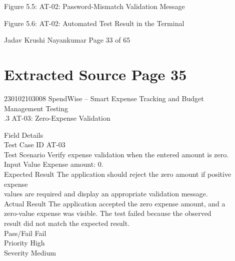 \documentclass[12pt,a4paper]{report}
\begin{document}
\smallskip

\smallskip

\smallskip

\smallskip
Figure 5.5: AT-02: Password-Mismatch Validation Message\\ 

\smallskip

\smallskip

\smallskip

\smallskip
Figure 5.6: AT-02: Automated Test Result in the Terminal\\ 

\smallskip

\smallskip
Jadav Krushi Nayankumar                                                   Page 33 of 65\\ 

\clearpage
\section*{Extracted Source Page 35}
230102103008                        SpendWise – Smart Expense Tracking and Budget\\ 
Management Testing\\ 

.3 AT-03: Zero-Expense Validation\\ 

\smallskip

\smallskip
Field                   Details\\ 
Test Case ID            AT-03\\ 
Test Scenario           Verify expense validation when the entered amount is zero.\\ 
Input Value             Expense amount: 0.\\ 
Expected Result         The application should reject the zero amount if positive expense\\ 
values are required and display an appropriate validation message.\\ 
Actual Result           The application accepted the zero expense amount, and a\\ 
zero-value expense was visible. The test failed because the observed\\ 
result did not match the expected result.\\ 
Pass/Fail               Fail\\ 
Priority                High\\ 
Severity                Medium\\ 
\end{document}
